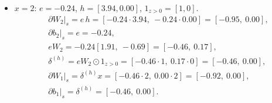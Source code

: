 \documentclass[11pt]{article}
\begin{document}
\begin{itemize}
\begin{align*}
&\partial b_2\big|_s = e = 0.99,\\
&eW_2 = 0.99[1.91,\ -0.69] = [1.89,\ -0.68],\\
&\delta^{(h)} = eW_2 \odot 1_{z>0} = [1.89\cdot1,\ -0.68\cdot0] = [1.89,\ 0.00],\\
&\partial W_1\big|_s = \delta^{(h)} x = [1.89\cdot1,\ 0.00\cdot1] = [1.89,\ 0.00],\\
&\partial b_1\big|_s = \delta^{(h)} = [1.89,\ 0.00].
\end{align*}
\item $x=2$: $e=-0.24$, $h=[3.94, 0.00]$, $1_{z>0}=[1,0]$.
\begin{align*}
&\partial W_2\big|_s = e\,h = [-0.24\cdot3.94,\ -0.24\cdot0.00] = [-0.95,\ 0.00],\\
&\partial b_2\big|_s = e = -0.24,\\
&eW_2 = -0.24[1.91,\ -0.69] = [-0.46,\ 0.17],\\
&\delta^{(h)} = eW_2 \odot 1_{z>0} = [-0.46\cdot1,\ 0.17\cdot0] = [-0.46,\ 0.00],\\
&\partial W_1\big|_s = \delta^{(h)} x = [-0.46\cdot2,\ 0.00\cdot2] = [-0.92,\ 0.00],\\
&\partial b_1\big|_s = \delta^{(h)} = [-0.46,\ 0.00].
\end{align*}
\end{itemize}
\end{document}
